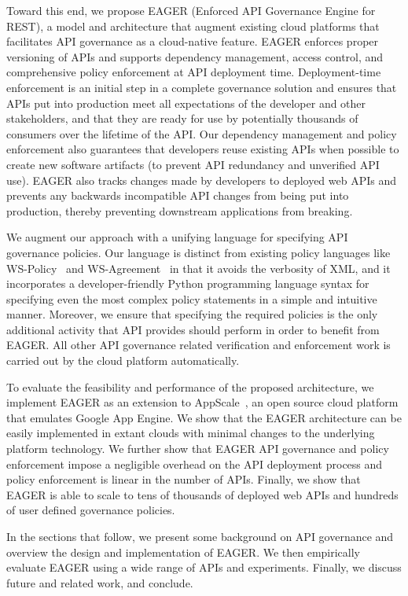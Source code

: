 Toward this end, we propose EAGER (Enforced API Governance Engine for REST), 
a model and architecture that augment existing
cloud platforms that facilitates API governance as a 
cloud-native feature. EAGER enforces proper versioning of APIs and supports dependency 
management, access control, and comprehensive policy enforcement at API deployment time. 
Deployment-time enforcement is an initial step in a complete governance
solution and ensures that APIs put into production meet all expectations of
the developer and other stakeholders, and that they are ready for use
by potentially thousands of consumers over the lifetime of the API.
Our dependency management and policy enforcement also guarantees that 
developers reuse existing APIs when possible to create new software artifacts
(to prevent API redundancy and unverified API use).
EAGER also tracks changes made by developers to deployed web APIs and prevents
any backwards incompatible API changes from being put into production, 
thereby preventing downstream applications from breaking.

We augment our approach with a unifying language for specifying 
API governance policies. Our language is distinct from 
existing policy languages like WS-Policy~\cite{WSPolicy,soagovstandard} and
WS-Agreement~\cite{WSAgreement} in that it avoids the verbosity of XML, 
and it incorporates a developer-friendly Python programming language syntax for 
specifying even the most complex policy statements in a simple and 
intuitive manner. Moreover, we ensure that specifying the required policies 
is the only additional activity that API provides should perform in
order to benefit from EAGER. All other API governance related verification and 
enforcement work is carried out by the cloud platform automatically.

To evaluate the feasibility and performance of the proposed 
architecture, we implement EAGER as an extension to AppScale~\cite{appscale13}, 
an open source
cloud platform that emulates Google App Engine. We show that the EAGER 
architecture can be easily implemented in extant clouds with
minimal changes to the underlying platform technology. We further show that 
EAGER API governance and policy enforcement impose a negligible 
overhead on the API deployment process and policy enforcement
is linear in the number of APIs.  Finally, we show that EAGER is able to
scale to tens of thousands of deployed web APIs and hundreds of user 
defined governance policies.

In the sections that follow, we present some background on API governance
and overview the design and implementation of
EAGER. We then empirically evaluate EAGER using a wide range of APIs and
experiments.  Finally, we discuss future and related work, and conclude.



